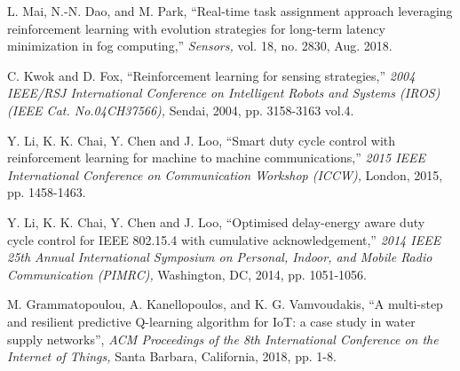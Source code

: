 \documentclass[journal]{IEEEtran}
\begin{document}
\begin{thebibliography}{1}
L. Mai, N.-N. Dao, and M. Park, ``Real-time task assignment approach leveraging reinforcement learning with evolution strategies for long-term latency minimization in fog computing,'' \emph{Sensors,} vol. 18, no. 2830, Aug. 2018.

C. Kwok and D. Fox, ``Reinforcement learning for sensing strategies,'' \emph{2004 IEEE/RSJ International Conference on Intelligent Robots and Systems (IROS) (IEEE Cat. No.04CH37566),} Sendai, 2004, pp. 3158-3163 vol.4.

Y. Li, K. K. Chai, Y. Chen and J. Loo, ``Smart duty cycle control with reinforcement learning for machine to machine communications,'' \emph{2015 IEEE International Conference on Communication Workshop (ICCW),} London, 2015, pp. 1458-1463.

Y. Li, K. K. Chai, Y. Chen and J. Loo, ``Optimised delay-energy aware duty cycle control for IEEE 802.15.4 with cumulative acknowledgement,'' \emph{2014 IEEE 25th Annual International Symposium on Personal, Indoor, and Mobile Radio Communication (PIMRC),} Washington, DC, 2014, pp. 1051-1056.

M. Grammatopoulou, A. Kanellopoulos, and K. G. Vamvoudakis, ``A multi-step and resilient predictive Q-learning algorithm for IoT: a case study in water supply networks'', \emph{ACM Proceedings of the 8th International Conference on the Internet of Things,} Santa Barbara, California, 2018, pp. 1-8.

\end{thebibliography}





\end{document}
